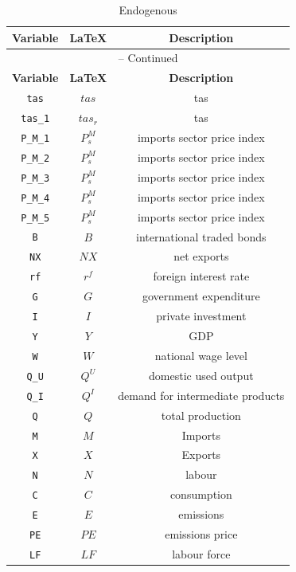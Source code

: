 \begin{center}
\begin{longtable}{ccc}
\caption{Endogenous}\\%
\hline%
\multicolumn{1}{c}{\textbf{Variable}} &
\multicolumn{1}{c}{\textbf{\LaTeX}} &
\multicolumn{1}{c}{\textbf{Description}}\\%
\hline\hline%
\endfirsthead
\multicolumn{3}{c}{{\tablename} \thetable{} -- Continued}\\%
\hline%
\multicolumn{1}{c}{\textbf{Variable}} &
\multicolumn{1}{c}{\textbf{\LaTeX}} &
\multicolumn{1}{c}{\textbf{Description}}\\%
\hline\hline%
\endhead
\texttt{tas} & ${tas}$ & tas\\
\texttt{tas\_1} & ${tas_{r}}$ & tas\\
\texttt{P\_M\_1} & ${P^{M}_s}$ & imports sector price index\\
\texttt{P\_M\_2} & ${P^{M}_s}$ & imports sector price index\\
\texttt{P\_M\_3} & ${P^{M}_s}$ & imports sector price index\\
\texttt{P\_M\_4} & ${P^{M}_s}$ & imports sector price index\\
\texttt{P\_M\_5} & ${P^{M}_s}$ & imports sector price index\\
\texttt{B} & $B$ & international traded bonds\\
\texttt{NX} & $NX$ & net exports\\
\texttt{rf} & ${r^{f}}$ & foreign interest rate\\
\texttt{G} & $G$ & government expenditure\\
\texttt{I} & $I$ & private investment\\
\texttt{Y} & $Y$ & GDP\\
\texttt{W} & $W$ & national wage level\\
\texttt{Q\_U} & $Q^{U}$ & domestic used output\\
\texttt{Q\_I} & $Q^{I}$ & demand for intermediate products\\
\texttt{Q} & $Q$ & total production\\
\texttt{M} & $M$ & Imports\\
\texttt{X} & $X$ & Exports\\
\texttt{N} & $N$ & labour\\
\texttt{C} & $C$ & consumption\\
\texttt{E} & $E$ & emissions\\
\texttt{PE} & $PE$ & emissions price\\
\texttt{LF} & $LF$ & labour force\\

\end{longtable}
\end{center}
